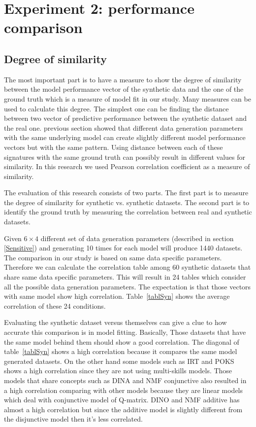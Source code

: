 \section{Experiment 2: performance comparison}


\subsection{Degree of similarity}
The most important part is to have a measure to show the degree of similarity between the model performance vector of the synthetic data and the one of the ground truth which is a measure of model fit in our study. Many measures can be used to calculate this degree. The simplest one can be finding the distance between two vector of predictive performance between the synthetic dataset and the real one. previous section showed that different data generation parameters with the same underlying model can create slightly different model performance vectors but with the same pattern. Using distance between each of these signatures with the same ground truth can possibly result in different values for similarity. In this research we used Pearson correlation coefficient as a measure of similarity.


The evaluation of this research consists of two parts. The first part is to measure the degree of similarity for synthetic vs. synthetic datasets. The second part is to identify the ground truth by measuring the correlation between real and synthetic datasets. 

Given $6\times 4$ different set of data generation parameters (described in section \ref{Sensitive}) and generating 10 times for each model will produce 1440 datasets. The comparison in our study is based on same data specific parameters. Therefore we can calculate the correlation table among 60 synthetic datasets that share same data specific parameters. This will result in 24 tables which consider all the possible data generation parameters. The expectation is that those vectors with same model show high correlation. Table~\ref{tablSyn} shows the average correlation of these 24  conditions.

Evaluating the synthetic dataset versus themselves can give a clue to how accurate this comparison is in model fitting. Basically, Those datasets that have the same model behind them should show a good correlation. The diagonal of table~\ref{tablSyn} shows a high correlation because it compares the same model generated datasets. On the other hand some models such as IRT and POKS shows a high correlation since they are not using multi-skills models. Those models that share concepts such as DINA and NMF conjunctive also resulted in a high correlation comparing with other models because they are linear models which deal with conjunctive model of Q-matrix. DINO and NMF additive has almost a high correlation but since the additive model is slightly different from the disjunctive model then it's less correlated.


